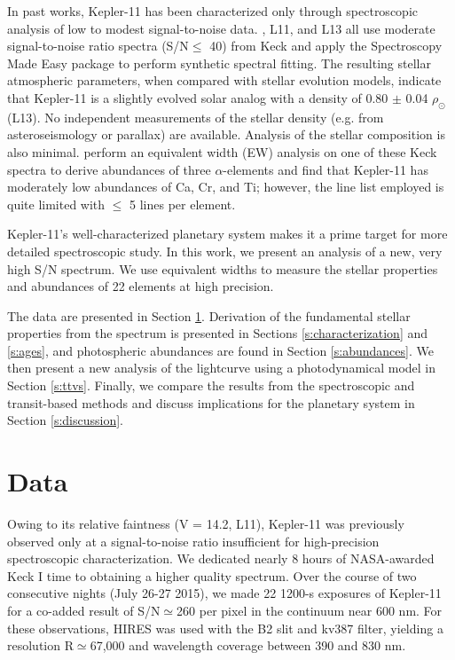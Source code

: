 \documentclass[oneside]{emulateapj}
\begin{document}
In past works, Kepler-11 has been characterized only through spectroscopic analysis of low to modest signal-to-noise data. \citet{Rowe2014}, L11, and L13 all use moderate signal-to-noise ratio spectra (S/N$\leq$ 40) from Keck and apply the Spectroscopy Made Easy package \citep[SME,][]{Valenti1996} to perform synthetic spectral fitting. The resulting stellar atmospheric parameters, when compared with stellar evolution models, indicate that Kepler-11 is a slightly evolved solar analog with a density of 0.80 $\pm$ 0.04 $\rho_{\odot}$ (L13). No independent measurements of the stellar density (e.g. from asteroseismology or parallax) are available. Analysis of the stellar composition is also minimal. \citet{Adibekyan2012b} perform an equivalent width (EW) analysis on one of these Keck spectra to derive abundances of three $\alpha$-elements and find that Kepler-11 has moderately low abundances of Ca, Cr, and Ti; however, the line list employed is quite limited with $\leq$ 5 lines per element.

Kepler-11's well-characterized planetary system makes it a prime target for more detailed spectroscopic study. In this work, we present an analysis of a new, very high S/N spectrum. We use equivalent widths to measure the stellar properties and abundances of 22 elements at high precision.

The data are presented in Section \ref{s:data}. Derivation of the fundamental stellar properties from the spectrum is presented in Sections \ref{s:characterization} and \ref{s:ages}, and photospheric abundances are found in Section \ref{s:abundances}. We then present a new analysis of the \Kepler lightcurve using a photodynamical model in Section \ref{s:ttvs}. Finally, we compare the results from the spectroscopic and transit-based methods and discuss implications for the planetary system in Section \ref{s:discussion}.


\section{Data}
\label{s:data}

Owing to its relative faintness (V = 14.2, L11), Kepler-11 was previously observed only at a signal-to-noise ratio insufficient for high-precision spectroscopic characterization. We dedicated nearly 8 hours of NASA-awarded Keck I time to obtaining a higher quality spectrum. Over the course of two consecutive nights (July 26-27 2015), we made 22 1200-s exposures of Kepler-11 for a co-added result of S/N$\simeq$260 per pixel in the continuum near 600 nm. For these observations, HIRES was used with the B2 slit and kv387 filter, yielding a resolution R$\simeq$67,000 and wavelength coverage between 390 and 830 nm.
\end{document}
